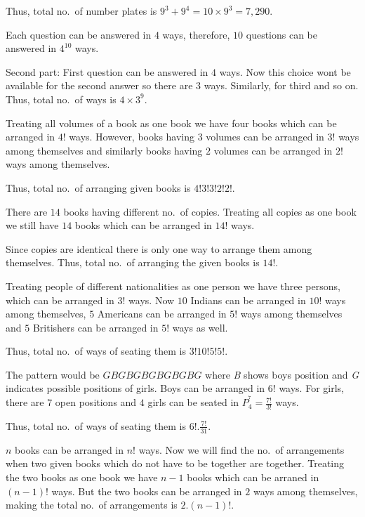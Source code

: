   Thus, total no.\ of number plates is $9^3 + 9^4 = 10\times9^3 = 7,290$.
\item Each question can be answered in $4$ ways, therefore, $10$ questions can be answered in $4^{10}$ ways.

  Second part: First question can be answered in $4$ ways. Now this choice won\symbol[rightquote]t be available for the second
  answer so there are $3$ ways. Similarly, for third and so on. Thus, total no.\ of ways is $4\times3^9$.
\item Treating all volumes of a book as one book we have four books which can be arranged in $4!$
  ways. However, books having $3$ volumes can be arranged in $3!$ ways among themselves and similarly books
  having $2$ volumes can be arranged in $2!$ ways among themselves.

  Thus, total no.\ of arranging given books is $4!3!3!2!2!$.
\item There are $14$ books having different no.\ of copies. Treating all copies as one book we still have
  $14$ books which can be arranged in $14!$ ways.

  Since copies are identical there is only one way to arrange them among themselves. Thus, total no.\ of
  arranging the given books is $14!$.
\item Treating people of different nationalities as one person we have three persons, which can be arranged
  in $3!$ ways. Now $10$ Indians can be arranged in $10!$ ways among themselves, $5$ Americans can be
  arranged in $5!$ ways among themselves and $5$ Britishers can be arranged in $5!$ ways as well.

  Thus, total no.\ of ways of seating them is $3!10!5!5!$.
\item The pattern would be $GBGBGBGBGBGBG$ where {\it B} shows boys position and {\it G} indicates possible
  positions of girls. Boys can be arranged in $6!$ ways. For girls, there are $7$ open positions and $4$
  girls can be seated in $P_4^^7 = \frac{7!}{3!}$ ways.

  Thus, total no.\ of ways of seating them is $6!.\frac{7!}{31}$.
\item $n$ books can be arranged in $n!$ ways. Now we will find the no.\ of arrangements when two given books
  which do not have to be together are together. Treating the two books as one book we have $n - 1$ books
  which can be arraned in $(n - 1)!$ ways. But the two books can be arranged in $2$ ways among themselves,
  making the total no.\ of arrangements is $2.(n - 1)!$.

